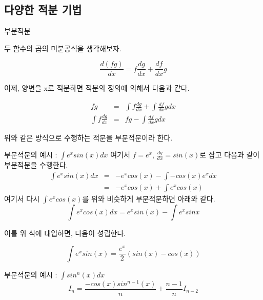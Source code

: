 \documentclass{beamer}
\begin{document}


\subsection{다양한 적분 기법} 


\begin{frame}{부분적분} 

두 함수의 곱의 미분공식을 생각해보자. 

\begin{equation} 
\frac{d(fg)}{dx} = f \frac{dg}{dx} + \frac{df}{dx} g
\end{equation}

이제, 양변을 x로 적분하면 적분의 정의에 의해서 다음과 같다. 

\begin{eqnarray} 
fg &=& \int f \frac{dg}{dx} + \int \frac{df}{dx} g dx \\
\int f \frac{dg}{dx} &=& fg - \int \frac{df}{dx} g dx 
\end{eqnarray} 

위와 같은 방식으로 수행하는 적분을 부분적분이라 한다. 
\end{frame}

\begin{frame}{부분적분의 예시 : $\int e^x sin(x) dx$}
여기서 $f = e^x$, $\frac{dg}{dx} = sin(x)$로 잡고 다음과 같이 부분적분을 수행한다. 
\begin{eqnarray} 
\int e^x sin(x) dx  &=& -e^x cos(x) - \int -cos(x) e^x dx \\
&=& -e^x cos(x) + \int e^x cos (x)
\end{eqnarray}
여기서 다시 $\int e^x cos(x)$를 위와 비슷하게 부분적분하면 아래와 같다. 
\begin{equation} 
\int e^x cos(x)dx  = e^x sin(x) - \int e^x sin x
\end{equation} 

이를 위 식에 대입하면, 다음이 성립한다. 

\begin{equation} 
\int e^x sin(x) = \frac{e^x}{2} (sin(x) - cos(x))
\end{equation} 

\end{frame}
\begin{frame}{부분적분의 예시 : $\int sin^n(x) dx$} 
\begin{equation} 
I_n = \frac{-cos(x)sin^{n-1}(x)}{n} + \frac{n-1}{n} I_{n-2}
\end{equation}
\end{frame}
\end{document}
